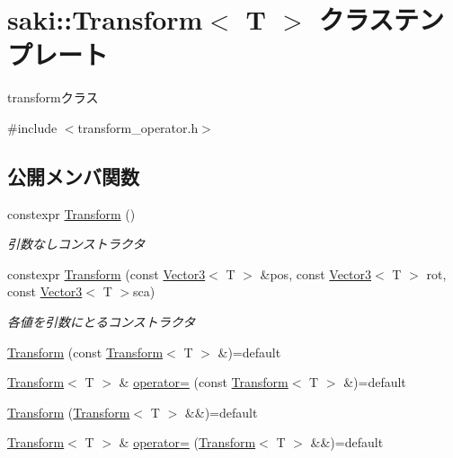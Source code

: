 \hypertarget{classsaki_1_1_transform}{}\section{saki\+:\+:Transform$<$ T $>$ クラステンプレート}
\label{classsaki_1_1_transform}


transformクラス  




{\ttfamily \#include $<$transform\+\_\+operator.\+h$>$}

\subsection*{公開メンバ関数}
\begin{DoxyCompactItemize}
\item 
constexpr \mbox{\hyperlink{classsaki_1_1_transform_abdd7b5f310bccc56b804a2cf21890a35}{Transform}} ()
\begin{DoxyCompactList}\small\item\em 引数なしコンストラクタ \end{DoxyCompactList}\item 
constexpr \mbox{\hyperlink{classsaki_1_1_transform_ad0081402f944d173d0a1df40762d571c}{Transform}} (const \mbox{\hyperlink{classsaki_1_1_vector3}{Vector3}}$<$ T $>$ \&pos, const \mbox{\hyperlink{classsaki_1_1_vector3}{Vector3}}$<$ T $>$ rot, const \mbox{\hyperlink{classsaki_1_1_vector3}{Vector3}}$<$ T $>$sca)
\begin{DoxyCompactList}\small\item\em 各値を引数にとるコンストラクタ \end{DoxyCompactList}\item 
\mbox{\hyperlink{classsaki_1_1_transform_a86e4e6b8c8a3387f5659e71b377a9995}{Transform}} (const \mbox{\hyperlink{classsaki_1_1_transform}{Transform}}$<$ T $>$ \&)=default
\item 
\mbox{\hyperlink{classsaki_1_1_transform}{Transform}}$<$ T $>$ \& \mbox{\hyperlink{classsaki_1_1_transform_acfdf423e01196edf631f272400645cfa}{operator=}} (const \mbox{\hyperlink{classsaki_1_1_transform}{Transform}}$<$ T $>$ \&)=default
\item 
\mbox{\hyperlink{classsaki_1_1_transform_a065323d290c8c4edd76855e7b9634ab8}{Transform}} (\mbox{\hyperlink{classsaki_1_1_transform}{Transform}}$<$ T $>$ \&\&)=default
\item 
\mbox{\hyperlink{classsaki_1_1_transform}{Transform}}$<$ T $>$ \& \mbox{\hyperlink{classsaki_1_1_transform_a66ea10234a845d96e63bbb9c2a1050eb}{operator=}} (\mbox{\hyperlink{classsaki_1_1_transform}{Transform}}$<$ T $>$ \&\&)=default

\end{DoxyCompactItemize}
